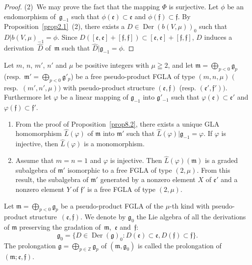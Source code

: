 \documentclass[11pt]{article}
\numberwithin{equation}{section}
\numberwithin{theorem}{section}
\numberwithin{proposition}{section}
\numberwithin{lemma}{section}
\numberwithin{corollary}{section}
\numberwithin{definition}{section}
\numberwithin{example}{section}
\numberwithin{remark}{section}
\numberwithin{note}{section}
\newcommand{\Der}{\operatorname{Der}}
\newcommand{\gla}[1]{\mathfrak#1=\bigoplus\limits_{p\in\mathbb Z}\mathfrak#1_p} \renewcommand{\labelenumi}{{\rm (\arabic{enumi})}}
\begin{document}
\begin{proof}
(2)~We may prove the fact that the mapping $\Phi$ is surjective.
Let $\phi$ be an endomorphism of~$\mathfrak g_{-1}$ such that
$\phi(\mathfrak e)\subset \mathfrak e$ and
$\phi(\mathfrak f)\subset \mathfrak f$.
By Proposition~\ref{prop2.1}~(2), there exists a $D\in\Der(b(V,\mu))_0$
such that $D|b(V,\mu)_{-1}=\phi$.
Since $D([\mathfrak e,\mathfrak e]+[\mathfrak f,\mathfrak f])
\subset [\mathfrak e,\mathfrak e]+[\mathfrak f,\mathfrak f]$,
$D$ induces a derivation~$\hat{D}$ of~$\mathfrak m$ such that
$\hat{D}|\mathfrak g_{-1}=\phi$.
\end{proof}

\begin{remark}\label{rem8.1}
Let $m$, $n$, $m'$, $n'$ and $\mu$ be positive integers with $\mu\geqq2$, and let
$\mathfrak m=\bigoplus\limits_{p<0}\mathfrak g_p$
(resp.\ $\mathfrak m'=\bigoplus\limits_{p<0}\mathfrak g'_p$) be a
free pseudo-product FGLA of type $(m,n,\mu)$ $($resp.~$(m',n',\mu))$
with pseudo-product structure $(\mathfrak e,\mathfrak f)$
(resp. $(\mathfrak e',\mathfrak f'))$.
Furthermore
let $\varphi$ be a linear mapping of $\mathfrak g_{-1}$ into
$\mathfrak g'_{-1}$ such that $\varphi(\mathfrak e)\subset \mathfrak e'$ and
$\varphi(\mathfrak f)\subset \mathfrak f'$.
\begin{enumerate}\itemsep=0pt
\item
From the proof of Proposition~\ref{prop8.2}, there exists a unique GLA
homomorphism $\hat{L}(\varphi)$ of $\mathfrak m$ into $\mathfrak m'$
such that $\hat{L}(\varphi)|\mathfrak g_{-1}=\varphi$.
If $\varphi$ is injective, then $\hat{L}(\varphi)$ is a monomorphism.
\item
Assume that $m=n=1$ and $\varphi$ is injective.
Then $\hat{L}(\varphi)(\mathfrak m)$ is a graded subalgebra of $\mathfrak m'$
isomorphic to a free FGLA of type $(2,\mu)$.
From this result,
the subalgebra of $\mathfrak m'$ generated by a nonzero element $X$ of
$\mathfrak e'$ and a nonzero element $Y$ of $\mathfrak f'$
is a free FGLA of type $(2,\mu)$.
\end{enumerate}
\end{remark}

Let $\mathfrak m=\bigoplus\limits_{p<0}\mathfrak g_p$ be a pseudo-product FGLA
of the $\mu$-th kind with pseudo-product structure~$(\mathfrak e,\mathfrak f)$.
We denote by $\mathfrak g_0$ the Lie algebra of
all the derivations of $\mathfrak m$ preserving the gradation of~$\mathfrak m$,~$\mathfrak e$ and~$\mathfrak f$:
\[
\mathfrak g_0=\{ D\in\Der(\mathfrak g)_0:D(\mathfrak e)\subset \mathfrak e,
D(\mathfrak f)\subset \mathfrak f \}.
\]
The prolongation
$\gla g$ of $(\mathfrak m,\mathfrak g_0)$ is called the prolongation of
$(\mathfrak m;\mathfrak e,\mathfrak f)$.
\end{document}
